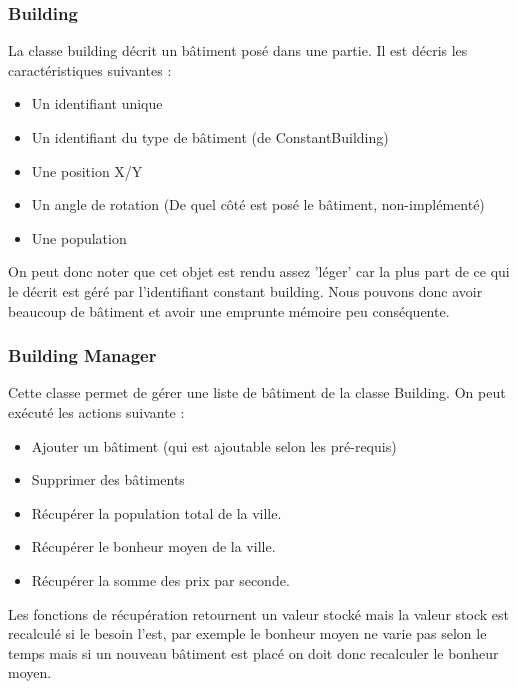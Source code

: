 \documentclass[a4paper,10pt,openany,oneside]{report}
\begin{document}
\subsubsection{Building}
La classe building décrit un bâtiment posé dans une partie. Il est décris les caractéristiques suivantes :
\begin{itemize}
	\item Un identifiant unique
	\item Un identifiant du type de bâtiment (de ConstantBuilding)
	\item Une position X/Y
	\item Un angle de rotation (De quel côté est posé le bâtiment, non-implémenté)
	\item Une population
\end{itemize}
On peut donc noter que cet objet est rendu assez 'léger' car la plus part de ce qui le décrit est géré par l'identifiant constant building. Nous pouvons donc avoir beaucoup de bâtiment et avoir une emprunte mémoire peu conséquente.

\subsubsection{Building Manager}
Cette classe permet de gérer une liste de bâtiment de la classe Building. On peut exécuté les actions suivante :
\begin{itemize}
	\item Ajouter un bâtiment (qui est ajoutable selon les pré-requis)
	\item Supprimer des bâtiments 
	\item Récupérer la population total de la ville.
	\item Récupérer le bonheur moyen de la ville.
	\item Récupérer la somme des prix par seconde.
\end{itemize}

Les fonctions de récupération retournent un valeur stocké mais la valeur stock est recalculé si le besoin l'est, par exemple le bonheur moyen ne varie pas selon le temps mais si un nouveau bâtiment est placé on doit donc recalculer le bonheur moyen.
\end{document}
